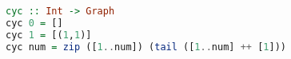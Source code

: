 \begin{lstlisting}[language=haskell]
cyc :: Int -> Graph
cyc 0 = []
cyc 1 = [(1,1)]
cyc num = zip ([1..num]) (tail ([1..num] ++ [1]))
\end{lstlisting}